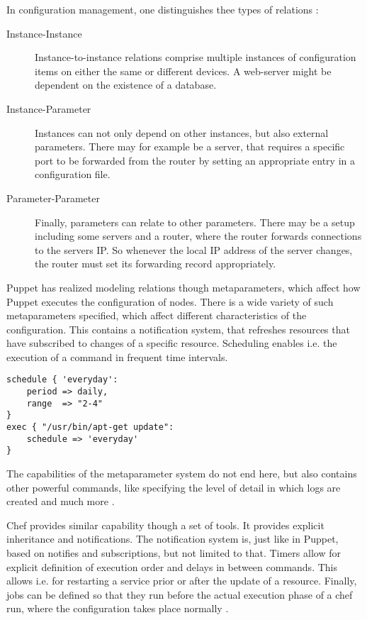 In configuration management, one distinguishes thee types of relations \cite{delaet2010survey}:
\begin{description}
	\item[Instance-Instance] Instance-to-instance relations comprise multiple instances of configuration items on either the same or different devices. A web-server might be dependent on the existence of a database.
	\item[Instance-Parameter] Instances can not only depend on other instances, but also external parameters. There may for example be a server, that requires a specific port to be forwarded from the router by setting an appropriate entry in a configuration file.
	\item[Parameter-Parameter] Finally, parameters can relate to other parameters. There may be a setup including some servers and a router, where the router forwards connections to the servers IP. So whenever the local IP address of the server changes, the router must set its forwarding record appropriately.
\end{description}

Puppet has realized modeling relations though metaparameters, which affect how Puppet executes the configuration of nodes. There is a wide variety of such metaparameters specified, which affect different characteristics of the configuration. This contains a notification system, that refreshes resources that have subscribed to changes of a specific resource. Scheduling enables i.e. the execution of a command in frequent time intervals.

\begin{verbatim}
schedule { 'everyday':
	period => daily,
	range  => "2-4"
}
exec { "/usr/bin/apt-get update":
	schedule => 'everyday'
}
\end{verbatim}

The capabilities of the metaparameter system do not end here, but also contains other powerful commands, like specifying the level of detail in which logs are created and much more  \cite{puppetcommetaparameter}.

Chef provides similar capability though a set of tools. It provides explicit inheritance and notifications. The notification system is, just like in Puppet, based on notifies and subscriptions, but not limited to that. Timers allow for explicit definition of execution order and delays in between commands. This allows i.e. for restarting a service prior or after the update of a resource. Finally, jobs can be defined so that they run before the actual execution phase of a chef run, where the configuration takes place normally \cite{chefiocommonfunc}.